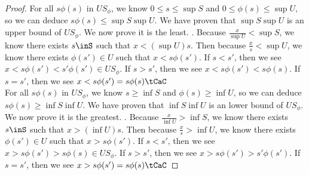 \documentclass{report}
\begin{document}
\begin{proof}
For all $s\phi (s)$ in $US_\phi $, we know $0\leq s\leq \sup S$ and $0\leq \phi (s)\leq \sup U$, so we can deduce $s\phi (s)\leq \sup S\sup U$. We have proven that $\sup S\sup U$ is an upper bound of $US_\phi $. We now prove it is the least. . Because $\frac{x}{\sup U}<\sup S$, we know there exists $s\inS$ such that $x<(\sup U)s$. Then because $\frac{x}{s}<\sup U$, we know there exists $\phi (s')\in U$ such that $x<s\phi (s')$. If $s<s'$, then we see  $x<s\phi (s')<s'\phi (s')\in US_\phi $. If $s>s'$, then we see  $x<s\phi (s')<s\phi (s)$. If $s=s'$, then we see $x<s\phi (s')=s\phi (s)\tCaC$\\


For all $s\phi (s)$ in $US_\phi $, we know $s\geq \inf  S$ and $ \phi (s)\geq \inf  U$, so we can deduce $s\phi (s)\geq \inf  S\inf  U$. We have proven that $\inf  S\inf  U$ is an lower bound of $US_\phi $. We now prove it is the greatest. . Because $\frac{x}{\inf  U}>\inf  S$, we know there exists $s\inS$ such that $x>(\inf  U)s$. Then because $\frac{x}{s}>\inf  U$, we know there exists $\phi (s')\in U$ such that $x>s\phi (s')$. If $s<s'$, then we see  $x>s\phi (s')>s\phi (s)\in US_\phi $. If $s>s'$, then we see  $x>s\phi (s')>s'\phi (s')$. If $s=s'$, then we see $x>s\phi (s')=s\phi (s)\tCaC$      
\end{proof}
\end{document}
